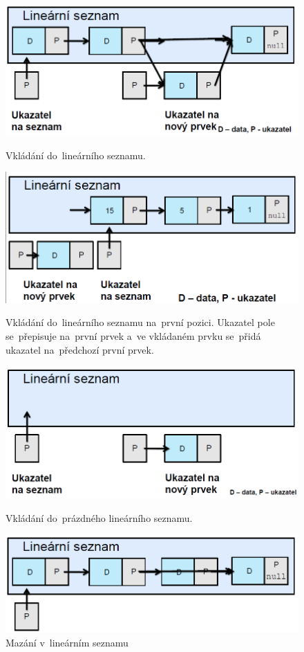 \begin{figure}[ht]
	\centering
	\includegraphics[scale=0.5]{images/sezins.PNG}
	\caption{Vkládání do~lineárního seznamu.}
	\label{sezins}

	\includegraphics[scale=0.5]{images/sezinsfirst.PNG}
	\caption{Vkládání do~lineárního seznamu na~první pozici. Ukazatel pole se~přepisuje na~první prvek a~ve vkládaném prvku se~přidá ukazatel na~předchozí první prvek.}

	\includegraphics[scale=0.5]{images/sezinsempty.PNG}
	\caption{Vkládání do~prázdného lineárního seznamu.}

	\includegraphics[scale=0.5]{images/sezdel.PNG}
	\caption{Mazání v~lineárním seznamu}
\end{figure}

